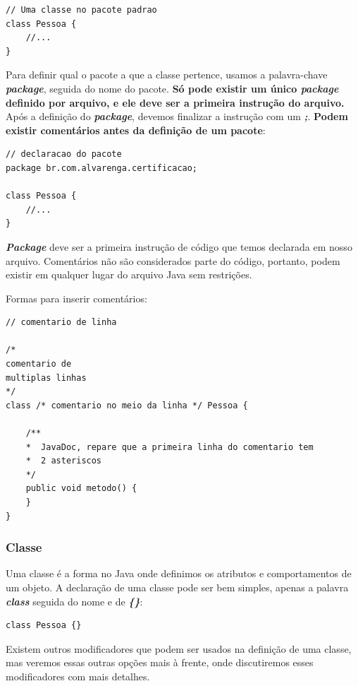 \documentclass[12pt]{article}
\begin{document}
\begin{lstlisting}
// Uma classe no pacote padrao
class Pessoa {
	//...
}
\end{lstlisting}

Para definir qual o pacote a que a classe pertence, usamos a palavra-chave \textbf{\textit{package}}, seguida do nome do pacote. \textbf{Só pode existir um único \textbf{\textit{package}} definido por arquivo, e ele deve ser a primeira instrução do arquivo.} Após a definição do \textbf{\textit{package}}, devemos finalizar a instrução com um \textbf{\textit{;}}. \textbf{Podem existir comentários antes da definição de um pacote}:

\begin{lstlisting}
// declaracao do pacote
package br.com.alvarenga.certificacao;
	
class Pessoa {
	//...
}
\end{lstlisting}

\textbf{\textit{Package}} deve ser a primeira instrução de código que temos declarada em nosso arquivo. Comentários não são considerados parte do código, portanto, podem existir em qualquer lugar do arquivo Java sem restrições.

Formas para inserir comentários:

\begin{lstlisting}
// comentario de linha

/*
comentario de
multiplas linhas
*/
class /* comentario no meio da linha */ Pessoa {
	
	/**
	*  JavaDoc, repare que a primeira linha do comentario tem
	*  2 asteriscos
	*/
	public void metodo() {
	}
}
\end{lstlisting}

\subsubsection{Classe}

Uma classe é a forma no Java onde definimos os atributos e comportamentos de um objeto. A declaração de uma classe pode ser bem simples, apenas a palavra \textbf{\textit{class}} seguida do nome e de \textbf{\textit{\{\}}}:

\begin{lstlisting}
class Pessoa {}
\end{lstlisting}

Existem outros modificadores que podem ser usados na definição de uma classe, mas veremos essas outras opções mais à frente, onde discutiremos esses modificadores com mais detalhes.
\end{document}
